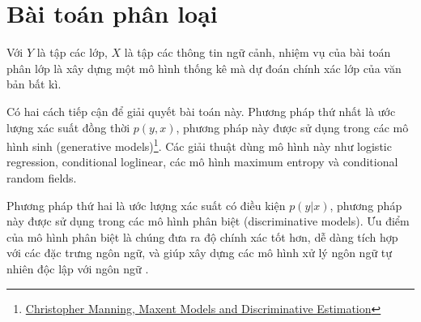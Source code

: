 \section{Bài toán phân loại}

Với $Y$ là tập các lớp, $X$ là tập các thông tin ngữ cảnh, nhiệm vụ của bài toán phân lớp là xây dựng một mô hình thống kê mà dự đoán chính xác lớp của văn bản bất kì.

Có hai cách tiếp cận để giải quyết bài toán này. Phương pháp thứ nhất là ước lượng xác suất đồng thời $p(y,x)$, phương pháp này được sử dụng trong các mô hình sinh (generative models)\footnote{\label{manning_maxent}\href{https://web.stanford.edu/class/cs124/lec/Maximum_Entropy_Classifiers.pdf}{Christopher Manning, Maxent Models and Discriminative Estimation}}. Các giải thuật dùng mô hình này như logistic regression, conditional loglinear, các mô hình maximum entropy và conditional random fields.

\noindent Phương pháp thứ hai là ước lượng xác suất có điều kiện $p(y|x)$, phương pháp này được sử dụng trong các mô hình phân biệt (discriminative models).
Ưu điểm của mô hình phân biệt là chúng đưa ra độ chính xác tốt hơn, dễ dàng tích hợp với các đặc trưng ngôn ngữ, và giúp xây dựng các mô hình xử lý ngôn ngữ tự nhiên độc lập với ngôn ngữ .

